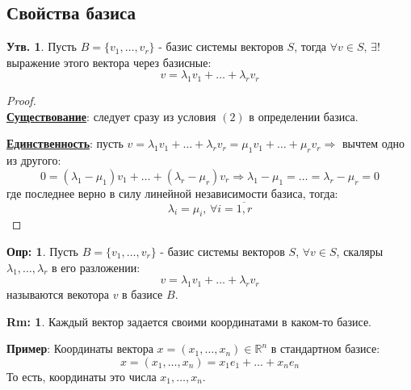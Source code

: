 \documentclass[12pt]{article}
\newcommand{\MR}{\mathbb{R}}
\theoremstyle{definition}
\newtheorem{defn}{Опр:}
\newtheorem{rem}{Rm:}
\newtheorem{prop}{Утв.}
\begin{document}
\subsection*{Свойства базиса}
\begin{prop}
	Пусть $B = \{v_1, \dotsc, v_r\}$ - базис системы векторов $S$, тогда $\forall v\in S,\, \exists! \,$ выражение этого вектора через базисные: 
	$$
		v = \lambda_1 v_1 + \dotsc + \lambda_rv_r
	$$
\end{prop}
\begin{proof}\hfill\\
	\uline{\textbf{Существование}}: следует сразу из условия $(2)$ в определении базиса.
	
	\uline{\textbf{Единственность}}: пусть $ v = \lambda_1 v_1 + \dotsc + \lambda_rv_r = \mu_1 v_1 + \dotsc + \mu_r v_r \Rightarrow$ вычтем одно из другого:
	$$
		0 = (\lambda_1 - \mu_1)v_1 + \dotsc + (\lambda_r - \mu_r)v_r \Rightarrow \lambda_1 - \mu_1 = \dotsc = \lambda_r - \mu_r = 0
	$$
	где последнее верно в силу линейной независимости базиса, тогда:
	$$
		\lambda_i =  \mu_i , \, \forall i = \overline{1,r}
	$$
\end{proof}
\begin{defn}
	Пусть $B = \{v_1, \dotsc, v_r\}$ - базис системы векторов $S$, $\forall v \in S$, скаляры $\lambda_1,\dotsc, \lambda_r$ в его разложении: 
	$$
		v = \lambda_1 v_1 + \dotsc +  \lambda_r v_r
	$$
	называются  векотора $v$ в базисе $B$.
\end{defn}
\begin{rem}
	Каждый вектор задается своими координатами в каком-то базисе.
\end{rem}

\textbf{Пример}: Координаты вектора $x = (x_1,\dotsc,x_n) \in \MR^n$ в стандартном базисе:
$$
	x = (x_1,\dotsc,x_n) = x_1 e_1  + \dotsc + x_n e_n
$$
То есть, координаты это числа $x_1, \dotsc, x_n$.
\end{document}
